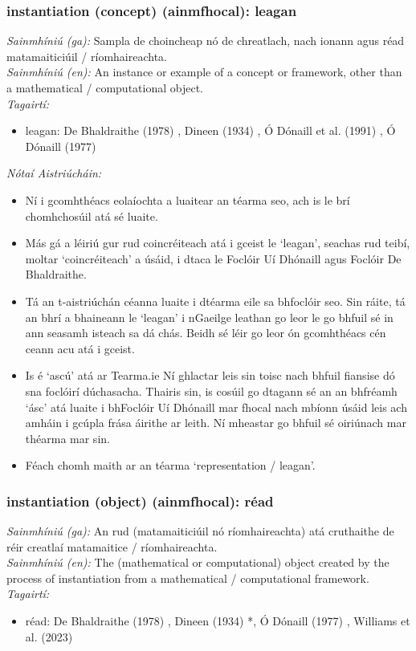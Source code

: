 \subsubsection*{instantiation (concept) (ainmfhocal): leagan}
 \noindent \textit{Sainmhíniú (ga):} Sampla de choincheap nó de chreatlach, nach ionann agus réad matamaiticiúil / ríomhaireachta.
\\
 \noindent \textit{Sainmhíniú (en):} An instance or example of a concept or framework, other than a mathematical / computational object.
\\
 \noindent \textit{Tagairtí:}
\begin{itemize}
	\item leagan: De Bhaldraithe (1978) \cite{de-bhaldraithe}, Dineen (1934) \cite{dineen}, Ó Dónaill et al. (1991) \cite{focloir-beag}, Ó Dónaill (1977) \cite{odonaill}
\end{itemize}

 \noindent \textit{Nótaí Aistriúcháin:}
\begin{itemize}
	\item Ní i gcomhthéacs eolaíochta a luaitear an téarma seo, ach is le brí chomhchosúil atá sé luaite.
	\item Más gá a léiriú gur rud coincréiteach atá i gceist le `leagan', seachas rud teibí, moltar `coincréiteach' a úsáid, i dtaca le Foclóir Uí Dhónaill agus Foclóir De Bhaldraithe.
	\item Tá an t-aistriúchán céanna luaite i dtéarma eile sa bhfoclóir seo. Sin ráite, tá an bhrí a bhaineann le `leagan' i nGaeilge leathan go leor le go bhfuil sé in ann seasamh isteach sa dá chás. Beidh sé léir go leor ón gcomhthéacs cén ceann acu atá i gceist.
	\item Is é `ascú' atá ar Tearma.ie Ní ghlactar leis sin toisc nach bhfuil fiansise dó sna foclóirí dúchasacha. Thairis sin, is cosúil go dtagann sé an an bhfréamh `ásc' atá luaite i bhFoclóir Uí Dhónaill mar fhocal nach mbíonn úsáid leis ach amháin i gcúpla frása áirithe ar leith. Ní mheastar go bhfuil sé  oiriúnach mar théarma mar sin.
	\item Féach chomh maith ar an téarma `representation / leagan'.
\end{itemize}


\subsubsection*{instantiation (object) (ainmfhocal): réad}
 \noindent \textit{Sainmhíniú (ga):} An rud (matamaiticiúil nó ríomhaireachta) atá cruthaithe de réir creatlaí matamaitice / ríomhaireachta.
\\
 \noindent \textit{Sainmhíniú (en):} The (mathematical or computational) object created by the process of instantiation from a mathematical / computational framework.
\\
 \noindent \textit{Tagairtí:}
\begin{itemize}
	\item réad: De Bhaldraithe (1978) \cite{de-bhaldraithe}, Dineen (1934) \cite{dineen}*, Ó Dónaill (1977) \cite{odonaill}, Williams et al. (2023) \cite{storchiste}
\end{itemize}

